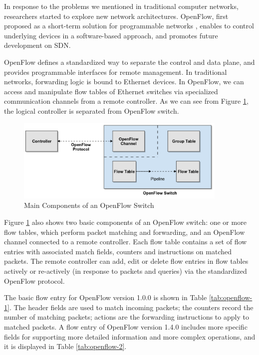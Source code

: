 \documentclass[english]{tktltiki}
\begin{document}
In response to the problems we mentioned in traditional computer networks, researchers started to explore new network architectures. OpenFlow, first proposed as a short-term solution for programmable networks \cite{mab+08}, enables to control underlying devices in a software-based approach, and promotes future development on SDN.

OpenFlow defines a standardized way to separate the control and data plane, and provides programmable interfaces for remote management. In traditional networks, forwarding logic is bound to Ethernet devices. In OpenFlow, we can access and manipulate flow tables of Ethernet switches via specialized communication channels from a remote controller. As we can see from Figure \ref{fig:openflow-1}, the logical controller is separated from OpenFlow switch.

\begin{figure}[htbp]
  \centering
  \includegraphics[width=0.9\textwidth]{images/openflow.png}
  \caption{Main Components of an OpenFlow Switch \cite{openflow-1.4.0}}
  \label{fig:openflow-1}
\end{figure}

Figure \ref{fig:openflow-1} also shows two basic components of an OpenFlow switch: one or more flow tables, which perform packet matching and forwarding, and an OpenFlow channel connected to a remote controller. Each flow table contains a set of flow entries with associated match fields, counters and instructions on matched packets. The remote controller can add, edit or delete flow entries in flow tables actively or re-actively (in response to packets and queries) via the standardized OpenFlow protocol.

The basic flow entry for OpenFlow version 1.0.0 \cite{openflow-1.0.0} is shown in Table \ref{tab:openflow-1}. The header fields are used to match incoming packets; the counters record the number of matching packets; actions are the forwarding instructions to apply to matched packets. A flow entry of OpenFlow version 1.4.0 \cite{openflow-1.4.0} includes more specific fields for supporting more detailed information and more complex operations, and it is displayed in Table \ref{tab:openflow-2}.
\end{document}
